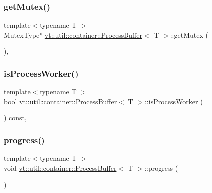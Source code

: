 \subsubsection{\texorpdfstring{get\+Mutex()}{getMutex()}}
{\footnotesize\ttfamily template$<$typename T $>$ \\
Mutex\+Type$\ast$ \hyperlink{structvt_1_1util_1_1container_1_1_process_buffer}{vt\+::util\+::container\+::\+Process\+Buffer}$<$ T $>$\+::get\+Mutex (\begin{DoxyParamCaption}{ }\end{DoxyParamCaption})\hspace{0.3cm}{\ttfamily [inline]}, {\ttfamily [private]}}

\mbox{\label{structvt_1_1util_1_1container_1_1_process_buffer_a334d729082827b50b57cde7aa27f137e}} 
\subsubsection{\texorpdfstring{is\+Process\+Worker()}{isProcessWorker()}}
{\footnotesize\ttfamily template$<$typename T $>$ \\
bool \hyperlink{structvt_1_1util_1_1container_1_1_process_buffer}{vt\+::util\+::container\+::\+Process\+Buffer}$<$ T $>$\+::is\+Process\+Worker (\begin{DoxyParamCaption}{ }\end{DoxyParamCaption}) const\hspace{0.3cm}{\ttfamily [inline]}, {\ttfamily [private]}}

\mbox{\label{structvt_1_1util_1_1container_1_1_process_buffer_aab87efa377b2b94320ba7c83b568b227}} 
\subsubsection{\texorpdfstring{progress()}{progress()}}
{\footnotesize\ttfamily template$<$typename T $>$ \\
void \hyperlink{structvt_1_1util_1_1container_1_1_process_buffer}{vt\+::util\+::container\+::\+Process\+Buffer}$<$ T $>$\+::progress (\begin{DoxyParamCaption}{ }\end{DoxyParamCaption})\hspace{0.3cm}{\ttfamily [inline]}}

